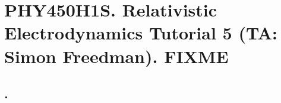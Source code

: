 
%

\chapter{PHY450H1S.  Relativistic Electrodynamics Tutorial 5 (TA: Simon Freedman).  FIXME}
\label{chap:relativisticElectrodynamicsT5}
{}
\date{Feb 17, 2011}

\beginArtWithToc

\section{.}

\EndNoBibArticle
